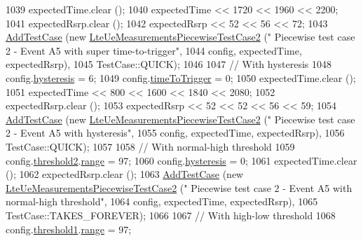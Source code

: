 \begin{DoxyCode}
1039   expectedTime.clear ();
1040   expectedTime << 1720 << 1960 << 2200;
1041   expectedRsrp.clear ();
1042   expectedRsrp << 52 << 56 << 72;
1043   \hyperlink{classns3_1_1TestCase_a3718088e3eefd5d6454569d2e0ddd835}{AddTestCase} (\textcolor{keyword}{new} \hyperlink{classLteUeMeasurementsPiecewiseTestCase2}{LteUeMeasurementsPiecewiseTestCase2} (\textcolor{stringliteral}{"
      Piecewise test case 2 - Event A5 with super time-to-trigger"},
1044                                                         config, expectedTime, expectedRsrp),
1045                TestCase::QUICK);
1046 
1047   \textcolor{comment}{// With hysteresis}
1048   config.\hyperlink{structns3_1_1LteRrcSap_1_1ReportConfigEutra_a1fb9169ea261ba20af6a0c18fcc04fa9}{hysteresis} = 6;
1049   config.\hyperlink{structns3_1_1LteRrcSap_1_1ReportConfigEutra_aee64b76b166b1beda5bbe1760363ed24}{timeToTrigger} = 0;
1050   expectedTime.clear ();
1051   expectedTime << 800 << 1600 << 1840 << 2080;
1052   expectedRsrp.clear ();
1053   expectedRsrp << 52 << 52 << 56 << 59;
1054   \hyperlink{classns3_1_1TestCase_a3718088e3eefd5d6454569d2e0ddd835}{AddTestCase} (\textcolor{keyword}{new} \hyperlink{classLteUeMeasurementsPiecewiseTestCase2}{LteUeMeasurementsPiecewiseTestCase2} (\textcolor{stringliteral}{"
      Piecewise test case 2 - Event A5 with hysteresis"},
1055                                                         config, expectedTime, expectedRsrp),
1056                TestCase::QUICK);
1057 
1058   \textcolor{comment}{// With normal-high threshold}
1059   config.\hyperlink{structns3_1_1LteRrcSap_1_1ReportConfigEutra_a4c76552279ea09626d15b48b341bfbd1}{threshold2}.\hyperlink{structns3_1_1LteRrcSap_1_1ThresholdEutra_abd4950e20a1a93727535e8364bf85b03}{range} = 97;
1060   config.\hyperlink{structns3_1_1LteRrcSap_1_1ReportConfigEutra_a1fb9169ea261ba20af6a0c18fcc04fa9}{hysteresis} = 0;
1061   expectedTime.clear ();
1062   expectedRsrp.clear ();
1063   \hyperlink{classns3_1_1TestCase_a3718088e3eefd5d6454569d2e0ddd835}{AddTestCase} (\textcolor{keyword}{new} \hyperlink{classLteUeMeasurementsPiecewiseTestCase2}{LteUeMeasurementsPiecewiseTestCase2} (\textcolor{stringliteral}{"
      Piecewise test case 2 - Event A5 with normal-high threshold"},
1064                                                         config, expectedTime, expectedRsrp),
1065                TestCase::TAKES\_FOREVER);
1066 
1067   \textcolor{comment}{// With high-low threshold}
1068   config.\hyperlink{structns3_1_1LteRrcSap_1_1ReportConfigEutra_a8f36bc45a61054920e490be8bf33b4ca}{threshold1}.\hyperlink{structns3_1_1LteRrcSap_1_1ThresholdEutra_abd4950e20a1a93727535e8364bf85b03}{range} = 97;

\end{DoxyCode}
